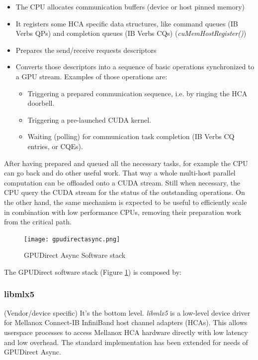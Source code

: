 \documentclass[conference]{IEEEtran}
\begin{document}
\begin{itemize}
\item The CPU allocates communication buffers (device or host pinned memory)
\item It registers some HCA specific data structures, like command queues (IB Verbs QPs) and completion queues (IB Verbs CQs) (\textit{cuMemHostRegister()})
\item Prepares the send/receive requests descriptors
\item Converts those descriptors into a sequence of basic operations synchronized to a GPU stream. Examples of those operations are:	\begin{itemize}
		\item Triggering a prepared communication sequence, i.e. by ringing the HCA doorbell.
		\item Triggering a pre-launched CUDA kernel.
		\item Waiting (polling) for communication task completion (IB Verbs CQ entries, or CQEs).
	\end{itemize}
\end{itemize}

After having prepared and queued all the necessary tasks, for example the CPU can go back and do other useful work.
%
That way a whole multi-host parallel computation can be offloaded onto a CUDA stream.
%
Still when necessary, the CPU query the CUDA stream for the status of the outstanding operations.
%
On the other hand, the same mechanism is expected to be useful to efficiently scale in combination with low performance CPUs, removing their preparation work from the critical path.

\begin{figure}[h]
\centering
\texttt{[image: gpudirectasync.png]}
\caption{GPUDirect Async Software stack}
\label{fig:gpudirectasync}
\end{figure}

The GPUDirect software stack (Figure \ref{fig:gpudirectasync}) is composed by:

\subsubsection{libmlx5}(Vendor/device specific)
It's the bottom level. \emph{libmlx5} is a low-level device driver for Mellanox Connect-IB InfiniBand host channel adapters (HCAs). This allows userspace processes to access Mellanox HCA hardware directly with low latency and low overhead. The standard implementation has been extended for needs of GPUDirect Async.
\end{document}
